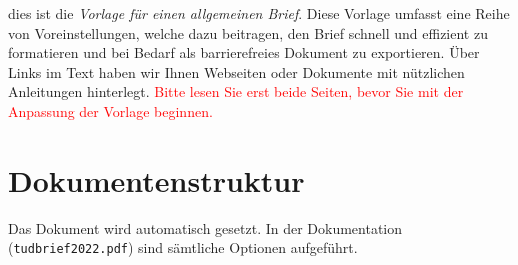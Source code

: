 \documentclass[twoside]{tudbrief2022}
\begin{document}
	\maketitle{}
	
	dies ist die \emph{Vorlage für einen allgemeinen Brief}.
	Diese Vorlage umfasst eine Reihe von Voreinstellungen, welche dazu beitragen, den Brief schnell und effizient zu formatieren und bei Bedarf als barrierefreies Dokument zu exportieren.
	Über Links im Text haben wir Ihnen Webseiten oder Dokumente mit nützlichen Anleitungen hinterlegt.
	\textcolor{red}{Bitte lesen Sie erst beide Seiten, bevor Sie mit der Anpassung der Vorlage beginnen.}
	
	\section*{Dokumentenstruktur}
	Das Dokument wird automatisch gesetzt. In der Dokumentation (\verb|tudbrief2022.pdf|) sind sämtliche Optionen aufgeführt.
	
	
	
\end{document}
